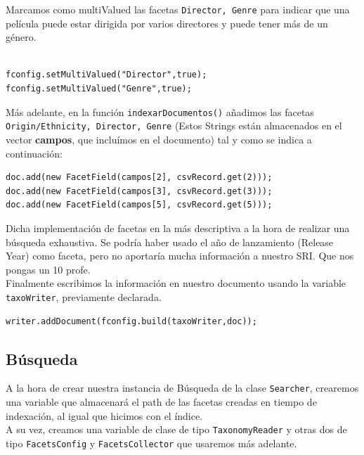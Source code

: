 Marcamos como multiValued las facetas \texttt{Director, Genre} para indicar que una película puede estar dirigida por varios directores y puede tener más de un género.

\begin{lstlisting}

fconfig.setMultiValued("Director",true);
fconfig.setMultiValued("Genre",true);
\end{lstlisting} 



 Más adelante, en la función \texttt{indexarDocumentos()} añadimos las facetas \texttt{Origin/Ethnicity, Director, Genre} (Estos Strings están almacenados en el vector \textbf{campos}, que incluímos en el documento) tal y como se indica a continuación: 

\begin{lstlisting}
doc.add(new FacetField(campos[2], csvRecord.get(2)));
doc.add(new FacetField(campos[3], csvRecord.get(3)));
doc.add(new FacetField(campos[5], csvRecord.get(5)));

\end{lstlisting} 

Dicha implementación de facetas en la más descriptiva a la hora de realizar una búsqueda exhaustiva. Se podría haber usado el año de lanzamiento (Release Year) como faceta, pero  no aportaría mucha información a nuestro SRI. Que nos pongas un 10 profe. \\

Finalmente escribimos la información en nuestro documento usando la variable \texttt{taxoWriter}, previamente declarada.

\begin{lstlisting}
writer.addDocument(fconfig.build(taxoWriter,doc));

\end{lstlisting}


\subsection{Búsqueda}



A la hora de crear nuestra instancia de Búsqueda de la clase \texttt{Searcher}, crearemos una variable que almacenará el path de las facetas creadas en tiempo de indexación, al igual que hicimos con el índice. \\

A su vez, creamos una variable de clase de tipo \texttt{TaxonomyReader} y otras dos de tipo \texttt{FacetsConfig} y \texttt{FacetsCollector} que usaremos más adelante. \\

